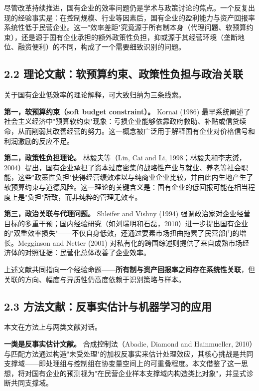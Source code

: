 \documentclass[11pt,a4paper]{ctexart}
\begin{document}
尽管改革持续推进，国有企业的效率问题仍是学术与政策讨论的焦点。一个反复出现的经验事实是：在控制规模、行业等因素后，国有企业的盈利能力与资产回报率系统性低于民营企业。这一"效率差距"究竟源于所有制本身（代理问题、软预算约束），还是源于国有企业承担的额外政策性负担，抑或源于其经营环境（垄断地位、融资便利）的不同，构成了一个需要细致识别的问题。

\subsection{2.2 理论文献：软预算约束、政策性负担与政治关联}

关于国有企业低效率的理论解释，可大致归纳为三条线索。

\textbf{第一，软预算约束（soft budget constraint）。} Kornai (1986) 最早系统阐述了社会主义经济中"预算软约束"现象：亏损企业能够依靠政府救助、补贴或信贷续命，从而削弱其改善经营的努力。这一概念被广泛用于解释国有企业对价格信号和利润激励的反应不足。

\textbf{第二，政策性负担理论。} 林毅夫等（Lin, Cai and Li, 1998；林毅夫和李志赟，2004）提出，国有企业承担了资本过度密集的战略性产业与就业、养老等社会职能，这些"政策性负担"使得经营绩效难以与纯商业企业比较，并由此内生地产生了软预算约束与道德风险。这一理论的关键含义是：国有企业的低回报可能在相当程度上是"负担"所致，而非纯粹的管理无效率。

\textbf{第三，政治关联与代理问题。} Shleifer and Vishny (1994) 强调政治家对企业经营目标的多重干预；国内经验研究（如刘瑞明和石磊，2010）进一步提出国有企业的"双重效率损失"------不仅自身低效，还通过要素市场扭曲拖累了民营部门的增长。Megginson and Netter (2001) 对私有化的跨国综述则提供了来自成熟市场经济体的对照证据：民营化总体改善了企业效率。

上述文献共同指向一个经验命题------\textbf{所有制与资产回报率之间存在系统性关联}，但关联的方向、幅度与异质性仍高度依赖于识别策略与样本。

\subsection{2.3 方法文献：反事实估计与机器学习的应用}

本文在方法上与两类文献对话。

\textbf{一类是反事实估计文献。} 合成控制法（Abadie, Diamond and Hainmueller, 2010）与匹配方法通过构造"未受处理"的加权反事实来估计处理效应，其核心挑战是共同支撑域------即处理组与控制组在协变量空间上的可重叠程度。本文借鉴了这一思想，将对国有企业的预测视为"在民营企业样本支撑域内构造类比对象"，并显式诊断共同支撑域。
\end{document}

